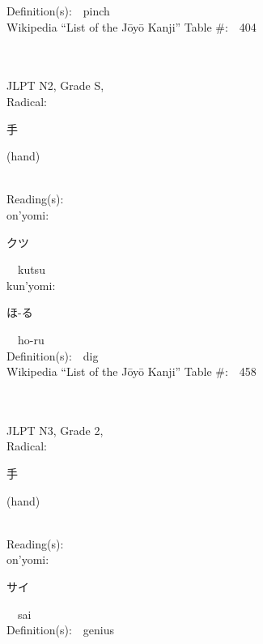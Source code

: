 \begin{multicols}{2}
Definition(s):\ \ pinch \\
Wikipedia ``List of the J\=oy\=o Kanji'' Table \#:\ \ 404 \\
\ \ \\
{\fontsize{34pt}{40pt}  }\ \ \\  %
{JLPT N2, Grade S, \\Radical:\ \ {\begin{CJK}{UTF8}{min} 手 \end{CJK}} (hand) } \\
Reading(s):\ \ \\
{\hspace*{1em}}on'yomi:\ \ \\
{\hspace*{2em}}{\begin{CJK}{UTF8}{min} クツ \end{CJK}}\ \ kutsu\ \ \\
{\hspace*{1em}}kun'yomi:\ \ \\
{\hspace*{2em}}{\begin{CJK}{UTF8}{min} ほ-る \end{CJK}}\ \ ho-ru\ \ \\
Definition(s):\ \ dig \\
Wikipedia ``List of the J\=oy\=o Kanji'' Table \#:\ \ 458 \\
\ \ \\
{\fontsize{34pt}{40pt}  }\ \ \\  %
{JLPT N3, Grade 2, \\Radical:\ \ {\begin{CJK}{UTF8}{min} 手 \end{CJK}} (hand) } \\
Reading(s):\ \ \\
{\hspace*{1em}}on'yomi:\ \ \\
{\hspace*{2em}}{\begin{CJK}{UTF8}{min} サイ \end{CJK}}\ \ sai\ \ \\
Definition(s):\ \ genius \\

\end{multicols}
